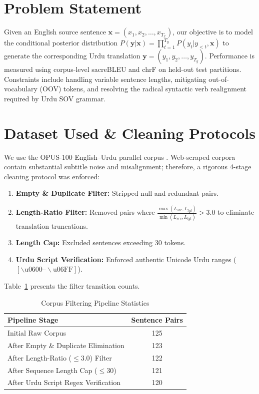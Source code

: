 \documentclass[10pt,journal,compsoc,twocolumn]{IEEEtran}
\begin{document}
\section{Problem Statement}
Given an English source sentence $\mathbf{x} = (x_1, x_2, \dots, x_{T_x})$, our objective is to model the conditional posterior distribution $P(\mathbf{y}|\mathbf{x}) = \prod_{t=1}^{T_y} P(y_t | y_{<t}, \mathbf{x})$ to generate the corresponding Urdu translation $\mathbf{y} = (y_1, y_2, \dots, y_{T_y})$. Performance is measured using corpus-level sacreBLEU and chrF on held-out test partitions. Constraints include handling variable sentence lengths, mitigating out-of-vocabulary (OOV) tokens, and resolving the radical syntactic verb realignment required by Urdu SOV grammar.

\section{Dataset Used \& Cleaning Protocols}
We use the OPUS-100 English--Urdu parallel corpus \cite{tiedemann2012parallel}. Web-scraped corpora contain substantial subtitle noise and misalignment; therefore, a rigorous 4-stage cleaning protocol was enforced:
\begin{enumerate}
    \item \textbf{Empty \& Duplicate Filter:} Stripped null and redundant pairs.
    \item \textbf{Length-Ratio Filter:} Removed pairs where $\frac{\max(L_{src}, L_{tgt})}{\min(L_{src}, L_{tgt})} > 3.0$ to eliminate translation truncations.
    \item \textbf{Length Cap:} Excluded sentences exceeding 30 tokens.
    \item \textbf{Urdu Script Verification:} Enforced authentic Unicode Urdu ranges ($[\backslash\text{u}0600\text{--}\backslash\text{u}06\text{FF}]$).
\end{enumerate}
Table~\ref{tab:cleaning_stats} presents the filter transition counts.

\begin{table}[htbp]
\centering
\caption{Corpus Filtering Pipeline Statistics}
\label{tab:cleaning_stats}
\begin{tabular}{lc}
\toprule
\textbf{Pipeline Stage} & \textbf{Sentence Pairs} \\
\midrule
Initial Raw Corpus & 125 \\
After Empty \& Duplicate Elimination & 123 \\
After Length-Ratio ($\le 3.0$) Filter & 122 \\
After Sequence Length Cap ($\le 30$) & 121 \\
After Urdu Script Regex Verification & 120 \\
\bottomrule
\end{tabular}
\end{table}
\end{document}
